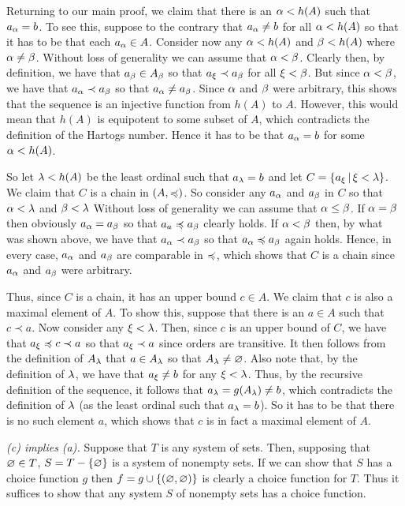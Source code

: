 \begin{questions}
{{    Returning to our main proof, we claim that there is an $\alpha < h(A)$ such that $a_\alpha = b$.
    To see this, suppose to the contrary that $a_\alpha \neq b$ for all $\alpha < h(A)$ so that it has to be that each $a_\alpha \in A$.
    Consider now any $\alpha < h(A)$ and $\beta < h(A)$ where $\alpha \neq \beta$.
    Without loss of generality we can assume that $\alpha < \beta$.
    Clearly then, by definition, we have that $a_\beta \in A_\beta$ so that $a_\xi \prec a_\beta$ for all $\xi < \beta$.
    But since $\alpha < \beta$, we have that $a_\alpha \prec a_\beta$ so that $a_\alpha \neq a_\beta$.
    Since $\alpha$ and $\beta$ were arbitrary, this shows that the sequence is an injective function from $h(A)$ to $A$.
    However, this would mean that $h(A)$ is equipotent to some subset of $A$, which contradicts the definition of the Hartogs number.
    Hence it has to be that $a_\alpha = b$ for some $\alpha < h(A)$.

    So let $\lambda < h(A)$ be the least ordinal such that $a_\lambda = b$ and let $C = \left\{ a_\xi \,|\, \xi < \lambda \right\}$.
    We claim that $C$ is a chain in $(A, \preccurlyeq)$.
    So consider any $a_\alpha$ and $a_\beta$ in $C$ so that $\alpha < \lambda$ and $\beta < \lambda$
    Without loss of generality we can assume that $\alpha \leq \beta$.
    If $\alpha = \beta$ then obviously $a_\alpha = a_\beta$ so that $a_a \preccurlyeq a_\beta$ clearly holds.
    If $\alpha < \beta$ then, by what was shown above, we have that $a_\alpha \prec a_\beta$ so that $a_\alpha \preccurlyeq a_\beta$ again holds.
    Hence, in every case, $a_\alpha$ and $a_\beta$ are comparable in $\preccurlyeq$, which shows that $C$ is a chain since $a_\alpha$ and $a_\beta$ were arbitrary.

    Thus, since $C$ is a chain, it has an upper bound $c \in A$.
    We claim that $c$ is also a maximal element of $A$.
    To show this, suppose that there is an $a \in A$ such that $c \prec a$.
    Now consider any $\xi < \lambda$.
    Then, since $c$ is an upper bound of $C$, we have that $a_\xi \preccurlyeq c \prec a$ so that $a_\xi \prec a$ since orders are transitive.
    It then follows from the definition of $A_\lambda$ that $a \in A_\lambda$ so that $A_\lambda \neq \varnothing$.
    Also note that, by the definition of $\lambda$, we have that $a_\xi \neq b$ for any $\xi < \lambda$.
    Thus, by the recursive definition of the sequence, it follows that $a_\lambda = g(A_\lambda) \neq b$, which contradicts the definition of $\lambda$ (as the least ordinal such that $a_\lambda = b$).
    So it has to be that there is no such element $a$, which shows that $c$ is in fact a maximal element of $A$.

    \emph{(c) implies (a).}
    Suppose that $T$ is any system of sets.
    Then, supposing that $\varnothing \in T$, $S = T - \left\{ \varnothing \right\}$ is a system of nonempty sets.
    If we can show that $S$ has a choice function $g$ then $f = g \cup \left\{ (\varnothing, \varnothing) \right\}$ is clearly a choice function for $T$.
    Thus it suffices to show that any system $S$ of nonempty sets has a choice function.

}}
\end{questions}
